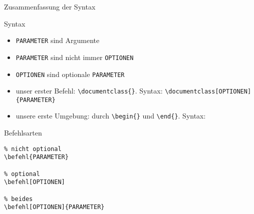 \begin{frame}{Zusammenfassung der Syntax}

\end{frame}

\begin{frame}{Syntax}

\begin{itemize}
\itemsep1pt\parskip0pt
\item
  \texttt{PARAMETER} sind Argumente
\item
  \texttt{PARAMETER} sind nicht immer \texttt{OPTIONEN}
\item
  \texttt{OPTIONEN} sind optionale \texttt{PARAMETER}
\item
  unser erster Befehl: \texttt{\textbackslash{}documentclass\{\}}.
  Syntax:
  \texttt{\textbackslash{}documentclass{[}OPTIONEN{]}\{PARAMETER\}}
\item
  unsere erste Umgebung: durch \texttt{\textbackslash{}begin\{\}} und
  \texttt{\textbackslash{}end\{\}}. Syntax:
\end{itemize}

\end{frame}

\begin{frame}[fragile]{Befehlsarten}

\begin{verbatim}
% nicht optional
\befehl{PARAMETER}

% optional
\befehl[OPTIONEN]

% beides
\befehl[OPTIONEN]{PARAMETER}
\end{verbatim}

\end{frame}
